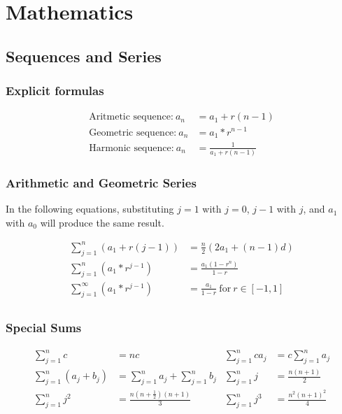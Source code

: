 \chapter{Mathematics}


\section{Sequences and Series}

\subsection{Explicit formulas}
\[\begin{aligned}
	\text{Aritmetic sequence:}~a_n &= a_1 + r(n - 1) \\
	\text{Geometric sequence:}~a_n &= a_1 * r^{n - 1} \\
	\text{Harmonic sequence:}~a_n &= \frac{1}{a_1 + r(n - 1)}
\end{aligned}\]

\subsection{Arithmetic and Geometric Series}

In the following equations, substituting $j=1$ with $j=0$, $j-1$ with $j$, and $a_1$ with $a_0$ will produce the same result.

\[\begin{aligned}
	\sum_{j=1}^{n} (a_1 + r(j-1)) &= \frac{n}{2}(2a_1 + (n - 1) d) \\
	\sum_{j=1}^{n} (a_1 * r^{j - 1}) &= \frac{a_1 (1-r^n)}{1-r} \\
	\sum_{j=1}^{\infty} (a_1 * r^{j - 1}) &= \frac{a_1}{1-r} ~\text{for}~ r \in [-1, 1] \\
\end{aligned}\]

\subsection{Special Sums}

\[
\begin{aligned}
	\sum_{j=1}^{n} c &= nc &
	\sum_{j=1}^{n} ca_j &= c \sum_{j=1}^{n} a_j \\
	\sum_{j=1}^{n} (a_j + b_j) &= \sum_{j=1}^{n} a_j + \sum_{j=1}^{n} b_j &
	\sum_{j=1}^{n} j &= \frac{n(n+1)}{2} \\
	\sum_{j=1}^{n} j^2 &= \frac{n(n+\frac{1}{2})(n+1)}{3} &
	\sum_{j=1}^{n} j^3 &= \frac{n^2(n+1)^2}{4} \\
\end{aligned}
\]

